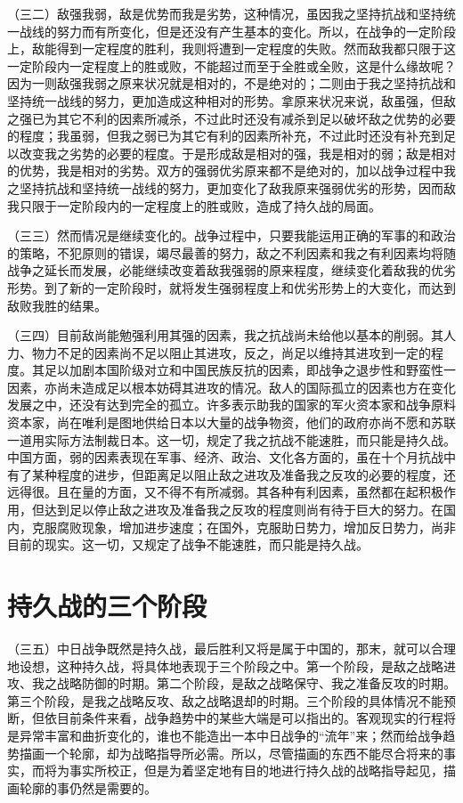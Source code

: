 （三二）敌强我弱，敌是优势而我是劣势，这种情况，虽因我之坚持抗战和坚持统一战线的努力而有所变化，但是还没有产生基本的变化。所以，在战争的一定阶段上，敌能得到一定程度的胜利，我则将遭到一定程度的失败。然而敌我都只限于这一定阶段内一定程度上的胜或败，不能超过而至于全胜或全败，这是什么缘故呢？因为一则敌强我弱之原来状况就是相对的，不是绝对的；二则由于我之坚持抗战和坚持统一战线的努力，更加造成这种相对的形势。拿原来状况来说，敌虽强，但敌之强已为其它不利的因素所减杀，不过此时还没有减杀到足以破坏敌之优势的必要的程度；我虽弱，但我之弱已为其它有利的因素所补充，不过此时还没有补充到足以改变我之劣势的必要的程度。于是形成敌是相对的强，我是相对的弱；敌是相对的优势，我是相对的劣势。双方的强弱优劣原来都不是绝对的，加以战争过程中我之坚持抗战和坚持统一战线的努力，更加变化了敌我原来强弱优劣的形势，因而敌我只限于一定阶段内的一定程度上的胜或败，造成了持久战的局面。

（三三）然而情况是继续变化的。战争过程中，只要我能运用正确的军事的和政治的策略，不犯原则的错误，竭尽最善的努力，敌之不利因素和我之有利因素均将随战争之延长而发展，必能继续改变着敌我强弱的原来程度，继续变化着敌我的优劣形势。到了新的一定阶段时，就将发生强弱程度上和优劣形势上的大变化，而达到敌败我胜的结果。

（三四）目前敌尚能勉强利用其强的因素，我之抗战尚未给他以基本的削弱。其人力、物力不足的因素尚不足以阻止其进攻，反之，尚足以维持其进攻到一定的程度。其足以加剧本国阶级对立和中国民族反抗的因素，即战争之退步性和野蛮性一因素，亦尚未造成足以根本妨碍其进攻的情况。敌人的国际孤立的因素也方在变化发展之中，还没有达到完全的孤立。许多表示助我的国家的军火资本家和战争原料资本家，尚在唯利是图地供给日本以大量的战争物资，他们的政府亦尚不愿和苏联一道用实际方法制裁日本。这一切，规定了我之抗战不能速胜，而只能是持久战。中国方面，弱的因素表现在军事、经济、政治、文化各方面的，虽在十个月抗战中有了某种程度的进步，但距离足以阻止敌之进攻及准备我之反攻的必要的程度，还远得很。且在量的方面，又不得不有所减弱。其各种有利因素，虽然都在起积极作用，但达到足以停止敌之进攻及准备我之反攻的程度则尚有待于巨大的努力。在国内，克服腐败现象，增加进步速度；在国外，克服助日势力，增加反日势力，尚非目前的现实。这一切，又规定了战争不能速胜，而只能是持久战。

\section{持久战的三个阶段}

（三五）中日战争既然是持久战，最后胜利又将是属于中国的，那末，就可以合理地设想，这种持久战，将具体地表现于三个阶段之中。第一个阶段，是敌之战略进攻、我之战略防御的时期。第二个阶段，是敌之战略保守、我之准备反攻的时期。第三个阶段，是我之战略反攻、敌之战略退却的时期。三个阶段的具体情况不能预断，但依目前条件来看，战争趋势中的某些大端是可以指出的。客观现实的行程将是异常丰富和曲折变化的，谁也不能造出一本中日战争的“流年”来；然而给战争趋势描画一个轮廓，却为战略指导所必需。所以，尽管描画的东西不能尽合将来的事实，而将为事实所校正，但是为着坚定地有目的地进行持久战的战略指导起见，描画轮廓的事仍然是需要的。

